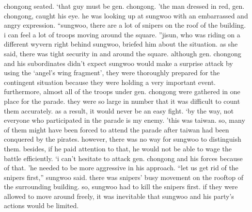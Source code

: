 chongong seated.
‘that guy must be gen.
 chongong.
’the man dressed in red, gen.
 chongong, caught his eye.
 he was looking up at sungwoo with an embarrassed and angry expression.
“sungwoo, there are a lot of snipers on the roof of the building.
 i can feel a lot of troops moving around the square.
”jisun, who was riding on a different wyvern right behind sungwoo, briefed him about the situation.
 as she said, there was tight security in and around the square.
although gen.
 chongong and his subordinates didn’t expect sungwoo would make a surprise attack by using the ‘angel’s wing fragment’, they were thoroughly prepared for the contingent situation because they were holding a very important event.
furthermore, almost all of the troops under gen.
 chongong were gathered in one place for the parade.
 they were so large in number that it was difficult to count them accurately.
as a result, it would never be an easy fight.
‘by the way, not everyone who participated in the parade is my enemy.
’this was taiwan.
 so, many of them might have been forced to attend the parade after taiwan had been conquered by the pirates.
however, there was no way for sungwoo to distinguish them.
 besides, if he paid attention to that, he would not be able to wage the battle efficiently.
‘i can’t hesitate to attack gen.
 chongong and his forces because of that.
’he needed to be more aggressive in his approach.
“let us get rid of the snipers first,” sungwoo said.
there was snipers’ busy movement on the rooftop of the surrounding building.
so, sungwoo had to kill the snipers first.
 if they were allowed to move around freely, it was inevitable that sungwoo and his party’s actions would be limited.

